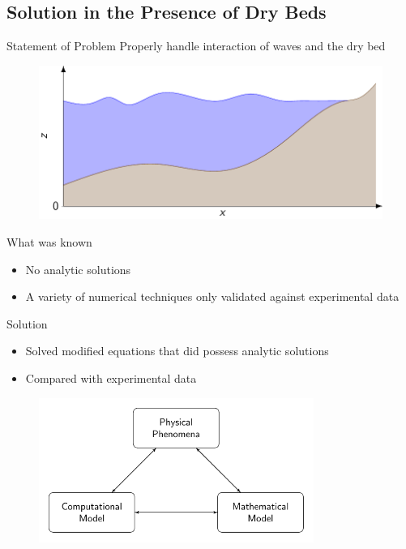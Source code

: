 \documentclass[handout]{beamer}
\begin{document}
\subsection{Solution in the Presence of Dry Beds}
\begin{frame}{Statement of Problem}
	Properly handle interaction of waves and the dry bed
		\begin{figure}
			\includegraphics[width=\textwidth]{./Pics/WaterModelDiagrams/FressSurface.pdf}
		\end{figure}
\end{frame}

\begin{frame}{What was known}
	\begin{itemize}
		\item No analytic solutions
		\item A variety of numerical techniques only validated against experimental data
	\end{itemize}
\end{frame}

\begin{frame}{Solution}
	\begin{itemize}
		\item Solved modified equations that did possess analytic solutions
		\item Compared with experimental data
	\end{itemize}
	\begin{figure}
		\includegraphics[width=0.8\textwidth]{./Pics/ModelDiagrams/FlowChart.pdf}
	\end{figure}
\end{frame}
\end{document}
